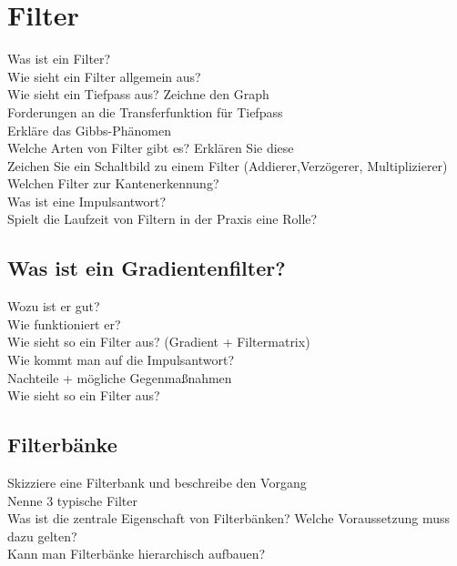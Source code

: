 \section{Filter}
\begin{description}
	\item[Was ist ein Filter?]
	\item[Wie sieht ein Filter allgemein aus?]
	\item[Wie sieht ein Tiefpass aus? Zeichne den Graph]
	\item[Forderungen an die Transferfunktion für Tiefpass]
	\item[Erkläre das Gibbs-Phänomen]
	\item[Welche Arten von Filter gibt es? Erklären Sie diese]
	\item[Zeichen Sie ein Schaltbild zu einem Filter (Addierer,Verzögerer, Multiplizierer)]
	\item[Welchen Filter zur Kantenerkennung?]
	\item[Was ist eine Impulsantwort?]
	\item[Spielt die Laufzeit von Filtern in der Praxis eine Rolle?]
\end{description}
\subsection{Was ist ein Gradientenfilter?}
\begin{description}
	\item[Wozu ist er gut?]
	\item[Wie funktioniert er?]
	\item[Wie sieht so ein Filter aus? (Gradient + Filtermatrix)]
	\item[Wie kommt man auf die Impulsantwort?]
	\item[Nachteile + mögliche Gegenmaßnahmen]
	\item[Wie sieht so ein Filter aus?]
\end{description}
\subsection{Filterbänke}
\begin{description}
	\item[Skizziere eine Filterbank und beschreibe den Vorgang]
	\item[Nenne 3 typische Filter]
	\item[Was ist die zentrale Eigenschaft von Filterbänken? Welche Voraussetzung muss dazu gelten?]
	\item[Kann man Filterbänke hierarchisch aufbauen?]
\end{description}

